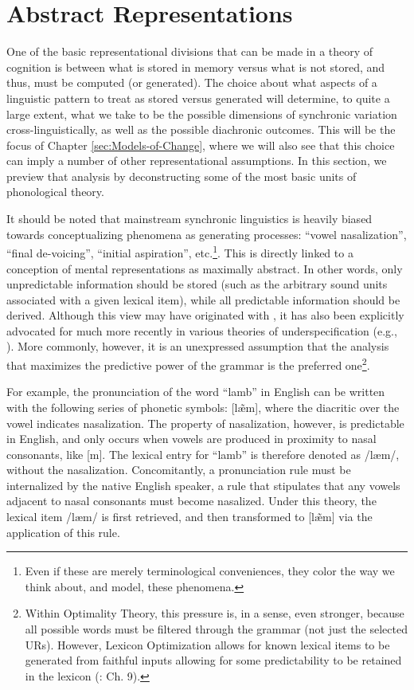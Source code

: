 \section{Abstract Representations}

One of the basic representational divisions that can be made in a
theory of cognition is between what is stored in memory versus what
is not stored, and thus, must be computed (or generated). The choice
about what aspects of a linguistic pattern to treat as stored versus
generated will determine, to quite a large extent, what we take to
be the possible dimensions of synchronic variation cross-linguistically,
as well as the possible diachronic outcomes. This will be the focus
of Chapter \ref{sec:Models-of-Change}, where we will also see that
this choice can imply a number of other representational assumptions.
In this section, we preview that analysis by deconstructing some of
the most basic units of phonological theory.

It should be noted that mainstream synchronic linguistics is heavily
biased towards conceptualizing phenomena as generating processes:
“vowel nasalization”, “final de-voicing”, “initial
aspiration”, etc.\footnote{Even if these are merely terminological conveniences, they color the
way we think about, and model, these phenomena.}. This is directly linked to a conception of mental representations
as maximally abstract. In other words, only unpredictable information
should be stored (such as the arbitrary sound units associated with
a given lexical item), while all predictable information should be
derived. Although this view may have originated with \citet{Chomsky1968},
it has also been explicitly advocated for much more recently in various
theories of underspecification (e.g., \citealt{archangeli1988aspects,Steriade1995a}).
More commonly, however, it is an unexpressed assumption that the analysis
that maximizes the predictive power of the grammar is the preferred
one\footnote{Within Optimality Theory, this pressure is, in a sense, even stronger,
because all possible words must be filtered through the grammar (not
just the selected URs). However, Lexicon Optimization allows for known
lexical items to be generated from faithful inputs allowing for some
predictability to be retained in the lexicon (\citealt{Prince2004}:
Ch. 9). }.

For example, the pronunciation of the word “lamb” in English
can be written with the following series of phonetic symbols: {[læ̃m]},
where the diacritic over the vowel indicates nasalization. The property
of nasalization, however, is predictable in English, and only occurs
when vowels are produced in proximity to nasal consonants, like {[}m{]}.
The lexical entry for “lamb” is therefore denoted as {/læm/},
without the nasalization. Concomitantly, a pronunciation rule must
be internalized by the native English speaker, a rule that stipulates
that any vowels adjacent to nasal consonants must become nasalized.
Under this theory, the lexical item {/læm/} is first retrieved,
and then transformed to {[læ̃m]} via the application of
this rule. 

